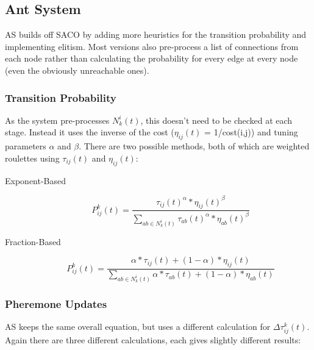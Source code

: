 \newpage

\subsection{Ant System}
AS builds off SACO by adding more heuristics for the transition probability and implementing elitism. Most versions also pre-process a list of connections from each node rather than calculating the probability for every edge at every node (even the obviously unreachable ones). 

\subsubsection{Transition Probability}
As the system pre-processes $ N^i_k(t)$, this doesn't need to be checked at each stage. Instead it uses the inverse of the cost ($\eta_{ij}(t)$ = 1/cost(i,j)) and tuning parameters $\alpha$ and $\beta$. There are two possible methods, both of which are weighted roulettes using $\tau_{ij}(t)$ and $\eta_{ij}(t)$: 

\begin{description}
\item [Exponent-Based]
\begin{equation}
 P_{ij}^k(t) = \frac{\tau_{ij}(t)^\alpha * \eta_{ij}(t)^\beta}{\sum_{ab \in N^i_k(t)} \tau_{ab}(t)^\alpha * \eta_{ab}(t)^\beta} 
\end{equation}
\item [Fraction-Based]
\begin{equation}
 P_{ij}^k(t) = \frac{\alpha * \tau_{ij}(t) + (1- \alpha) * \eta_{ij}(t)}{\sum_{ab \in N^i_k(t)} \alpha * \tau_{ab}(t) + (1- \alpha) * \eta_{ab}(t)} 
\end{equation}
\end{description}


\subsubsection{Pheremone Updates}
AS keeps the same overall equation, but uses a different calculation for $\Delta \tau_{ij}^k(t)$. Again there are three different calculations, each gives slightly different results:

